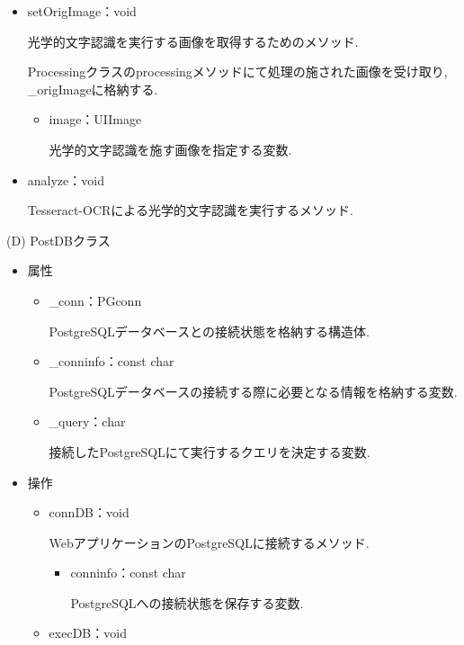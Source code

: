 \begin{description}
\begin{itemize}
\begin{itemize}
\item setOrigImage：void

光学的文字認識を実行する画像を取得するためのメソッド.

Processingクラスのprocessingメソッドにて処理の施された画像を受け取り, \_origImageに格納する.
\begin{itemize}
\item image：UIImage

光学的文字認識を施す画像を指定する変数.
\end{itemize}

\item analyze：void

Tesseract-OCRによる光学的文字認識を実行するメソッド.
\end{itemize}

\end{itemize}

\item (D) PostDBクラス
\begin{itemize}
\item 属性

\begin{itemize}
\item \_conn：PGconn

PostgreSQLデータベースとの接続状態を格納する構造体.

\item \_conninfo：const char

PostgreSQLデータベースの接続する際に必要となる情報を格納する変数.

\item \_query：char

接続したPostgreSQLにて実行するクエリを決定する変数.
\end{itemize}

\item 操作

\begin{itemize}
\item connDB：void

WebアプリケーションのPostgreSQLに接続するメソッド.
\begin{itemize}
\item conninfo：const char

PostgreSQLへの接続状態を保存する変数.
\end{itemize}

\item execDB：void


\end{itemize}
\end{itemize}
\end{description}
